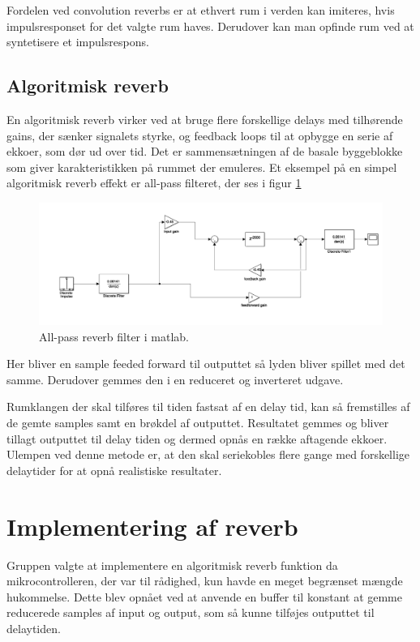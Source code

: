 Fordelen ved convolution reverbs er at ethvert rum i verden kan imiteres, hvis impulsresponset for det valgte rum haves.\newline
Derudover kan man opfinde rum ved at syntetisere et impulsrespons.

\subsection{Algoritmisk reverb}
En algoritmisk reverb virker ved at bruge flere forskellige delays med tilhørende gains, der sænker signalets styrke, og feedback loops til at opbygge en serie af ekkoer, som dør ud over tid.
Det er sammensætningen af de basale byggeblokke som giver karakteristikken på rummet der emuleres.\newline
Et eksempel på en simpel algoritmisk reverb effekt er all-pass filteret, der ses i figur \ref{fig:allPassMatLab}
\begin{figure}[h]
\centering
\includegraphics[width=1\linewidth]{./billeder/reverb-testopsaetning.png}
\caption{All-pass reverb filter i matlab.}
\label{fig:allPassMatLab}
\end{figure}
Her bliver en sample feeded forward til outputtet så lyden bliver spillet med det samme.
Derudover gemmes den i en reduceret og inverteret udgave. %

Rumklangen der skal tilføres til tiden fastsat af en delay tid, kan så fremstilles af de gemte samples samt en brøkdel af outputtet.
Resultatet gemmes og bliver tillagt outputtet til delay tiden og dermed opnås en række aftagende ekkoer.
Ulempen ved denne metode er, at den skal seriekobles flere gange med forskellige delaytider for at opnå realistiske resultater.


\section{Implementering af reverb}
Gruppen valgte at implementere en algoritmisk reverb funktion da mikrocontrolleren, der var til rådighed, kun havde en meget begrænset mængde hukommelse.
Dette blev opnået ved at anvende en buffer til konstant at gemme reducerede samples af input og output, som så kunne tilføjes outputtet til delaytiden.

